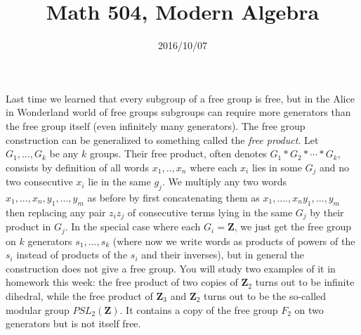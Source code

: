 \documentclass[10pt]{article}
\title{Math 504, Modern Algebra}
\date{2016/10/07}
\begin{document}
\maketitle

Last time we learned that every subgroup of a free group is free, but in
the Alice in Wonderland world of free groups subgroups can require more
generators than the free group itself (even infinitely many generators).
The free group construction can be generalized to something called the
{\sl free product}. Let $G_1,...,G_k$ be any $k$ groups. Their free
product, often denotes $G_1\ast G_2\ast\cdots\ast G_k$, consists by
definition of all words $x_1,..,x_n$ where each $x_i$ lies in some $G_j$
and no two consecutive $x_i$ lie in the same $g_j$. We multiply any two
words $x_1,...,x_n,y_1,...,y_m$ as before by first concatenating them as
$x_1,....,x_n y_1,...,y_m$ then replacing any pair $z_i z_j$ of
consecutive terms lying in the same $G_j$ by their product in $G_j$. In
the special case where each $G_i= \mathbf{Z}$, we just get the free
group on $k$ generators $s_1,...,s_k$ (where now we write words as
products of powers of the $s_i$ instead of products of the $s_i$ and
their inverses), but in general the construction does not give a free
group. You will study two examples of it in homework this week: the free
product of two copies of $\mathbf{Z}_2$ turns out to be infinite
dihedral, while the free product of $\mathbf{Z}_3$ and $\mathbf{Z}_2$
turns out to be the so-called modular group $PSL_2(\mathbf{Z})$. It
contains a copy of the free group $F_2$ on two generators but is not
itself free.
\end{document}
